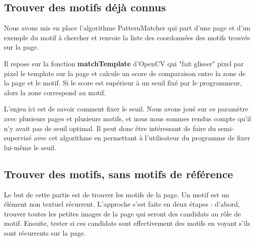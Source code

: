 \documentclass[a4paper, 12pt]{article}
\begin{document}
\subsection{Trouver des motifs déjà connus}
\label{sec:motifs connus}

Nous avons mis en place l'algorithme PatternMatcher qui part d'une page et d'un exemple du motif à chercher et renvoie la liste des coordonnées des motifs trouvés sur la page.

Il repose sur la fonction \textbf{matchTemplate} d'OpenCV qui "fait glisser" pixel par pixel le template sur la page et calcule un score de comparaison entre la zone de la page et le motif. Si le score est supérieur à un seuil fixé par le programmeur, alors la zone correspond au motif.

L'enjeu ici est de savoir comment fixer le seuil. Nous avons joué sur ce paramètre avec plusieurs pages et plusieurs motifs, et nous nous sommes rendus compte qu'il n'y avait pas de seuil optimal. Il peut donc être intéressant de faire du semi-supervisé avec cet algorithme en permettant à l'utilisateur du programme de fixer lui-même le seuil.


\subsection{Trouver des motifs, sans motifs de référence}
Le but de cette partie est de trouver les motifs de la page. Un motif est un élément non textuel récurrent. L'approche s'est faite en deux étapes : d'abord, trouver toutes les petites images de la page qui seront des candidats au rôle de motif. Ensuite, tester si ces candidats sont effectivement des motifs en voyant s'ils sont récurrents sur la page.
\end{document}
